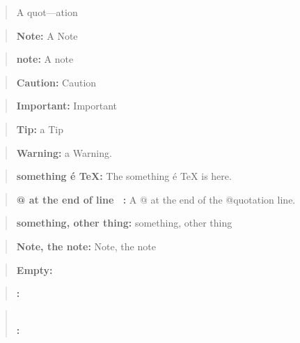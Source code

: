 \documentclass{book}
\begin{document}
\begin{titlepage}
\begin{quote}
A quot---ation
\end{quote}

\begin{quote}
\textbf{Note:} A Note
\end{quote}

\begin{quote}
\textbf{note:} A note
\end{quote}

\begin{quote}
\textbf{Caution:} Caution
\end{quote}

\begin{quote}
\textbf{Important:} Important
\end{quote}

\begin{quote}
\textbf{Tip:} a Tip
\end{quote}

\begin{quote}
\textbf{Warning:} a Warning.
\end{quote}

\begin{quote}
\textbf{something \'{e} \TeX{}:} The something \'{e} \TeX{} is here.
\end{quote}

\begin{quote}
\textbf{@ at the end of line \ {}:} A @ at the end of the @quotation line.
\end{quote}

\begin{quote}
\textbf{something, other thing:} something, other thing
\end{quote}

\begin{quote}
\textbf{Note, the note:} Note, the note
\end{quote}

\begin{quote}
\end{quote}

\begin{quote}
\textbf{Empty:} \end{quote}

\begin{quote}
\textbf{:} \end{quote}

\begin{quote}
\textbf{\leavevmode{}\\:} \end{quote}


\end{titlepage}
\end{document}
